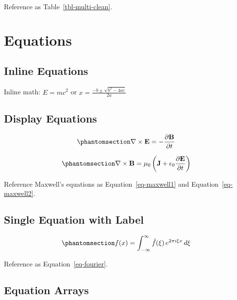 \documentclass[
  letterpaper,
  oneside,
  openany]{MastersDoctoralThesis}
\theoremstyle{plain}
\theoremstyle{remark}
\begin{document}
Reference as Table~\ref{tbl-multi-clean}.

\section*{Equations}\label{sec-equations}


\subsection*{Inline Equations}\label{inline-equations}

Inline math: \(E = mc^2\) or \(x = \frac{-b \pm \sqrt{b^2-4ac}}{2a}\)

\subsection*{Display Equations}\label{display-equations}

\begin{equation}\phantomsection\label{eq-maxwell1}{
\nabla \times \mathbf{E} = -\frac{\partial \mathbf{B}}{\partial t}
}\end{equation}

\begin{equation}\phantomsection\label{eq-maxwell2}{
\nabla \times \mathbf{B} = \mu_0\left(\mathbf{J} + \epsilon_0\frac{\partial \mathbf{E}}{\partial t}\right)
}\end{equation}

Reference Maxwell's equations as Equation~\ref{eq-maxwell1} and
Equation~\ref{eq-maxwell2}.

\subsection*{Single Equation with
Label}\label{single-equation-with-label}

\begin{equation}\phantomsection\label{eq-fourier}{
f(x) = \int_{-\infty}^{\infty} \hat{f}(\xi)\,e^{2 \pi i \xi x} \,d\xi
}\end{equation}

Reference as Equation~\ref{eq-fourier}.

\subsection*{Equation Arrays}\label{equation-arrays}
\end{document}
